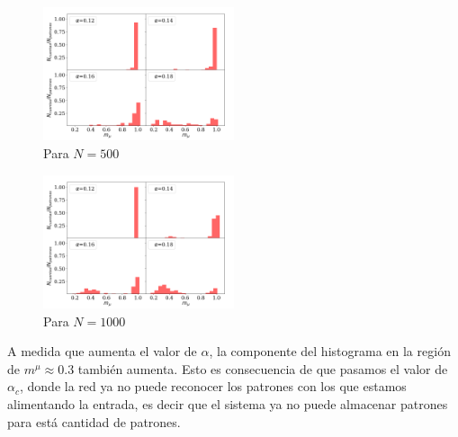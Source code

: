 \begin{figure}[H]
	\centering
	\includegraphics[width=0.5\textwidth]{../Graficos/500.png}
	\caption{Para $N=500$}
	\label{fig:500}
\end{figure}
\begin{figure}[H]
	\centering
	\includegraphics[width=0.5\textwidth]{../Graficos/1000.png}
	\caption{Para $N=1000$}
	\label{fig:1000}
\end{figure}
A medida que aumenta el valor de $\alpha$, la componente del histograma en la región de $m^\mu \approx 0.3$ también aumenta. Esto es consecuencia de que pasamos el valor de $\alpha_c$, donde la red ya  no puede reconocer los patrones con los que estamos alimentando la entrada, es decir que el sistema ya no puede almacenar patrones para está cantidad de patrones.


